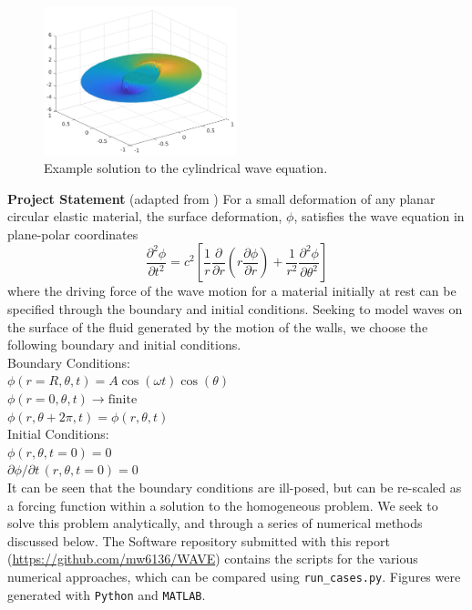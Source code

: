 \documentclass{homework}
\begin{document}
\begin{figure}[h!]
    \centering
    \includegraphics[width = 0.5\textwidth]{media/wave_sol.png}
    \caption{Example solution to the cylindrical wave equation.}
    \label{fig:wave_sol}
\end{figure}
\noindent \textbf{Project Statement} (adapted from \cite{MAE501}) \noindent For a small deformation of any planar circular elastic material, the surface deformation, $\phi$, satisfies the wave equation in plane-polar coordinates
\[ \frac{\partial^2 \phi}{\partial t^2} = c^2 \left[ \frac{1}{r} \frac{\partial}{\partial r} \left(r \frac{\partial \phi}{\partial r}\right) + \frac{1}{r^2} \frac{\partial^2 \phi}{\partial \theta^2} \right]\]
\noindent where the driving force of the wave motion for a material initially at rest can be specified through the boundary and initial conditions. Seeking to model waves on the surface of the fluid generated by the motion of the walls, we choose the following boundary and initial conditions. \\[8pt]
\noindent Boundary Conditions: \\
$ \phi(r=R, \theta, t) = A \cos(\omega t) \cos (\theta) $ \\
$ \phi(r=0, \theta, t) \rightarrow \textrm{finite} $ \\
$ \phi(r, \theta + 2\pi, t) = \phi(r, \theta, t) $ \\[8pt]
\noindent Initial Conditions: \\
$ \phi(r, \theta, t=0) = 0 $ \\
$ \partial \phi/ \partial t \, (r, \theta, t=0) = 0 $
\\[8pt] \noindent
It can be seen that the boundary conditions are ill-posed, but can be re-scaled as a forcing function within a solution to the homogeneous problem. We seek to solve this problem analytically, and through a series of numerical methods discussed below. The Software repository submitted with this report (\href{https://github.com/mw6136/WAVE}{https://github.com/mw6136/WAVE}) contains the scripts for the various numerical approaches, which can be compared using \texttt{run\_cases.py}. Figures were generated with \texttt{Python} and \texttt{MATLAB}.
\end{document}
